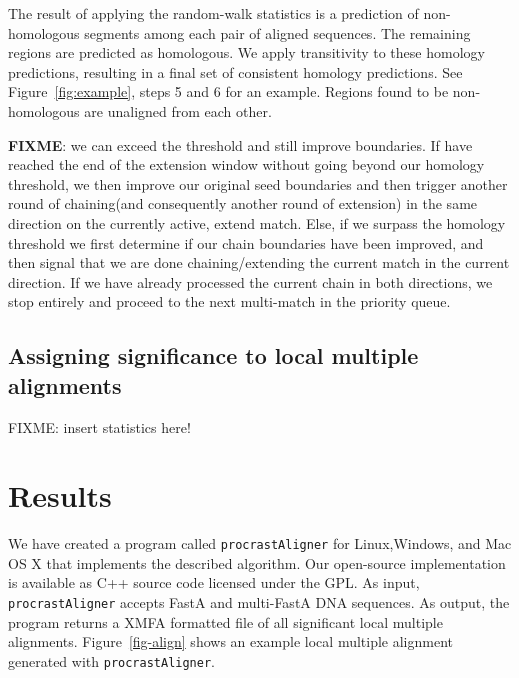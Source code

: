 \documentclass[twoside,11pt]{article}
\begin{document}
The result of applying the random-walk statistics is a prediction of non-homologous segments among each pair of aligned sequences.  The remaining regions are predicted as homologous.  We apply transitivity to these homology predictions, resulting in a final set of consistent homology predictions.  See Figure~\ref{fig:example}, steps 5 and 6 for an example. Regions found to be non-homologous are unaligned from each other.


\textbf{FIXME}: we can exceed the threshold and still improve boundaries.  If have reached the end of the extension window without going beyond our homology threshold, we then improve our original seed boundaries and then trigger another round of chaining(and consequently another round of extension) in the same direction on the currently active, extend match. Else, if we surpass the homology threshold we first determine if our chain boundaries have been improved, and then signal that we are done chaining/extending the current match in the current direction. If we have already processed the current chain in both directions, we stop entirely and proceed to the next multi-match in the priority queue.


\subsection{Assigning significance to local multiple alignments}
FIXME: insert statistics here!

\section{Results}
We have created a program called \texttt{procrastAligner} for Linux,Windows, and Mac OS X that implements the described algorithm. Our
open-source implementation is available as C++ source code licensed under the GPL. As input, \texttt{procrastAligner} accepts FastA and multi-FastA DNA sequences. As output, the program returns a XMFA formatted file of all significant local multiple alignments. Figure~\ref{fig-align} shows an example local multiple alignment generated with \texttt{procrastAligner}.
\end{document}
